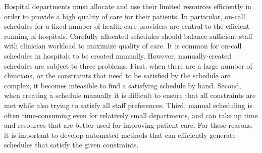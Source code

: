 Hospital departments must allocate and use their limited resources efficiently
in order to provide a high quality of care for their patients.
In particular, on-call schedules for
a fixed number of health-care providers are central to the efficient running of
hospitals. Carefully allocated schedules should balance
sufficient staff with clinician workload  %
to maximize quality of care. It is common for on-call schedules in
hospitals to be created manually. However,
manually-created schedules are subject to three problems.
First, when there are a large number of clinicians,
or the constraints that need to be satisfied
by the schedule are complex, it becomes infeasible
to find a satisfying schedule by hand.
Second, when creating a schedule manually it is difficult to ensure
that all constraints are met while also trying to satisfy all staff
preferences.
Third, manual scheduling is often time-consuming even for relatively small 
departments, and can take up time and resources that are better used
for improving patient care.
For these reasons, it is important to develop automated methods that
can efficiently generate schedules that satisfy the given constraints.


